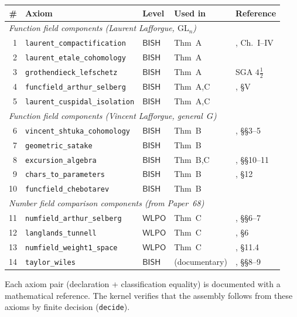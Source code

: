 \documentclass[11pt]{article}
\theoremstyle{plain}
\theoremstyle{definition}
\theoremstyle{remark}
\newcommand{\GL}{\mathrm{GL}}
\newcommand{\BISH}{\mathsf{BISH}}
\newcommand{\WLPO}{\mathsf{WLPO}}
\begin{document}
\begin{center}
\small
\begin{tabular}{rllll}
\toprule
\textbf{\#} & \textbf{Axiom} & \textbf{Level} & \textbf{Used in} & \textbf{Reference} \\
\midrule
\multicolumn{5}{l}{\emph{Function field components (Laurent Lafforgue, $\GL_n$)}} \\
1 & \texttt{laurent\_compactification} & $\BISH$ & Thm~A & \cite{LLaf02}, Ch.~I--IV \\
2 & \texttt{laurent\_etale\_cohomology} & $\BISH$ & Thm~A & \cite{Deligne80} \\
3 & \texttt{grothendieck\_lefschetz} & $\BISH$ & Thm~A & SGA $4\tfrac{1}{2}$ \\
4 & \texttt{funcfield\_arthur\_selberg} & $\BISH$ & Thm~A,C & \cite{LLaf02}, \S V \\
5 & \texttt{laurent\_cuspidal\_isolation} & $\BISH$ & Thm~A,C & \cite{Harder74} \\
\midrule
\multicolumn{5}{l}{\emph{Function field components (Vincent Lafforgue, general~$G$)}} \\
6 & \texttt{vincent\_shtuka\_cohomology} & $\BISH$ & Thm~B & \cite{VLaf18}, \S\S3--5 \\
7 & \texttt{geometric\_satake} & $\BISH$ & Thm~B & \cite{MV07} \\
8 & \texttt{excursion\_algebra} & $\BISH$ & Thm~B,C & \cite{VLaf18}, \S\S10--11 \\
9 & \texttt{chars\_to\_parameters} & $\BISH$ & Thm~B & \cite{VLaf18}, \S12 \\
10 & \texttt{funcfield\_chebotarev} & $\BISH$ & Thm~B & \cite{Weil48} \\
\midrule
\multicolumn{5}{l}{\emph{Number field comparison components (from Paper~68)}} \\
11 & \texttt{numfield\_arthur\_selberg} & $\WLPO$ & Thm~C & \cite{Paper68}, \S\S6--7 \\
12 & \texttt{langlands\_tunnell} & $\WLPO$ & Thm~C & \cite{Paper68}, \S6 \\
13 & \texttt{numfield\_weight1\_space} & $\WLPO$ & Thm~C & \cite{Paper68}, \S11.4 \\
14 & \texttt{taylor\_wiles} & $\BISH$ & (documentary) & \cite{Paper68}, \S\S8--9 \\
\bottomrule
\end{tabular}
\end{center}

\medskip\noindent
Each axiom pair (declaration + classification equality) is documented with a
mathematical reference. The kernel verifies that the assembly follows from these
axioms by finite decision (\texttt{decide}).
\end{document}
